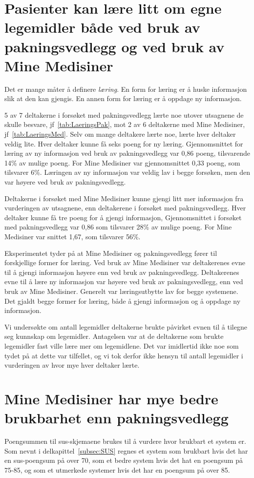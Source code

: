 \section[Læringsutbytte]{Pasienter kan lære litt om egne legemidler både ved bruk av pakningsvedlegg og ved bruk av Mine Medisiner}
Det er mange måter å definere \textit{læring}. En form for læring er å huske informasjon slik at den kan gjengis. En annen form for læring er å oppdage ny informasjon. 

5 av 7 deltakerne i forsøket med pakningsvedlegg lærte noe utover utsagnene de skulle besvare, jf~\ref{tab:LaeringsPak}, mot 2 av 6 deltakerne med Mine Medisiner, jf~\ref{tab:LaeringsMed}. 
Selv om mange deltakere lærte noe, lærte hver deltaker veldig lite. Hver deltaker kunne få seks poeng for ny læring. Gjennomsnittet for læring av ny informasjon ved bruk av pakningsvedlegg var 0,86 poeng, tilsvarende 14\% av mulige poeng. For Mine Medisiner var gjennomsnittet 0,33 poeng, som tilsvarer 6\%. Læringen av ny informasjon var veldig lav i begge forsøken, men den var høyere ved bruk av pakningsvedlegg. 

Deltakerne i forsøket med Mine Medisiner kunne gjengi litt mer informasjon fra vurderingen av utsagnene, enn deltakerene i forsøket med pakningsvedlegg. Hver deltaker kunne få tre poeng for å gjengi informasjon, Gjennomsnittet i forsøket med pakningsvedlegg var 0,86 som tilsvarer 28\% av mulige poeng. For Mine Medisiner var snittet 1,67, som tilsvarer 56\%.

Eksperimentet tyder på at Mine Medisiner og pakningsvedlegg fører til forskjellige former for læring. Ved bruk av Mine Medisiner var deltakerenes evne til å gjengi informasjon høyere enn ved bruk av pakningsvedlegg. Deltakerenes evne til å lære ny informasjon var høyere ved bruk av pakningsvedlegg, enn ved bruk av Mine Medisiner. Generelt var læringsutbytte lav for begge systemene. Det gjaldt begge former for læring, både å gjengi informasjon og å oppdage ny informasjon.

Vi undersøkte om antall legemidler deltakerne brukte påvirket evnen til å tilegne seg kunnskap om legemidler. Antagelsen var at de deltakerne som brukte legemidler fast ville lære mer om legemidlene. Det var imidlertid ikke noe som tydet på at dette var tilfellet, og vi tok derfor ikke hensyn til antall legemidler i vurderingen av hvor mye hver deltaker lærte. 

\section[Brukbarhet]{Mine Medisiner har mye bedre brukbarhet enn pakningsvedlegg}
Poengsummen til \acrshort{sus}-skjemaene brukes til å vurdere hvor brukbart et system er. Som nevnt i delkapittel~\ref{subsec:SUS} regnes et system som brukbart hvis det har en \acrshort{sus}-poengsum på over 70, som et bedre system hvis det hat en poengsum på 75-85, og som et utmerkede systemer hvis det har en poengsum på over 85. 

